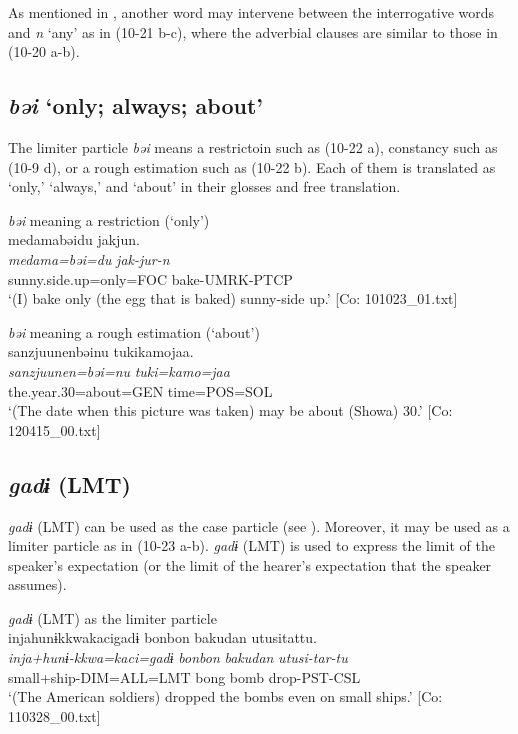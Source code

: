 As mentioned in , another word may intervene between the interrogative words and \textit{n} ‘any’ as in (10-21 b-c), where the adverbial clauses are similar to those in (10-20 a-b).

\subsection{\textit{bəi} ‘only; always; about’}\label{sec:10.1.4}

The limiter particle \textit{bəi} means a restrictoin such as (10-22 a), constancy such as (10-9 d), or a rough estimation such as (10-22 b). Each of them is translated as ‘only,’ ‘always,’ and ‘about’ in their glosses and free translation.

\ea\label{ex:10.22} 
 \ea\textit{bəi} meaning a restriction (‘only’)\\
      \glll    {\textbar}medama{\textbar}bəidu  jakjun.\\
      \textit{medama=bəi=du}  \textit{jak-jur-n}\\
      sunny.side.up=only=FOC  bake-UMRK-PTCP\\
      \glt       ‘(I) bake only (the egg that is baked) sunny-side up.’ [Co: 101023\_01.txt]

  \ex  \textit{bəi} meaning a rough estimation (‘about’)\\
      \glll    {\textbar}sanzjuunen{\textbar}bəinu  tukikamojaa.\\
      \textit{sanzjuunen=bəi=nu}  \textit{tuki=kamo=jaa}\\
      the.year.30=about=GEN  time=POS=SOL\\
      \glt       ‘(The date when this picture was taken) may be about (Showa) 30.’ [Co: 120415\_00.txt]
    \z
\z

\subsection{\textit{gadɨ} (LMT)}\label{sec:10.1.5}

\textit{gadɨ} (LMT) can be used as the case particle (see ). Moreover, it may be used as a limiter particle as in (10-23 a-b). \textit{gadɨ} (LMT) is used to express the limit of the speaker’s expectation (or the limit of the hearer’s expectation that the speaker assumes).

\ea\label{ex:10.23}   \textit{gadɨ} (LMT) as the limiter particle\\
    \ea%
      \glll    injahunɨkkwakacigadɨ  {\textbar}bonbon  bakudan  utusi{\textbar}tattu.\\
      \textit{inja+hunɨ-kkwa=kaci=gadɨ}  \textit{bonbon}  \textit{bakudan}  \textit{utusi-tar-tu}\\
      small+ship-DIM=ALL=LMT  bong  bomb  drop-PST-CSL\\
      \glt       ‘(The American soldiers) dropped the bombs even on small ships.’ [Co: 110328\_00.txt]

